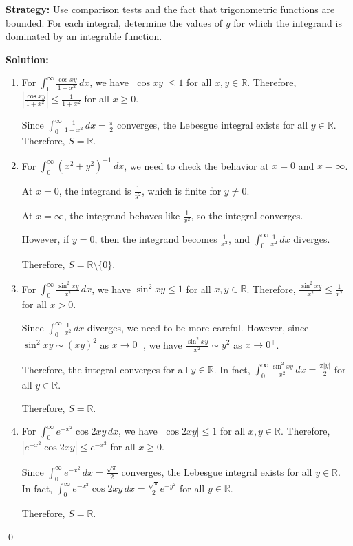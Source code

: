 \noindent\textbf{Strategy:} Use comparison tests and the fact that trigonometric functions are bounded. For each integral, determine the values of $y$ for which the integrand is dominated by an integrable function.

\bigskip\noindent\textbf{Solution:}
\begin{enumerate}[label=(\alph*)]
\item For $\int_{0}^{\infty} \frac{\cos xy}{1 + x^2} \, dx$, we have $|\cos xy| \leq 1$ for all $x, y \in \mathbb{R}$. Therefore, $|\frac{\cos xy}{1 + x^2}| \leq \frac{1}{1 + x^2}$ for all $x \geq 0$.

Since $\int_{0}^{\infty} \frac{1}{1 + x^2} \, dx = \frac{\pi}{2}$ converges, the Lebesgue integral exists for all $y \in \mathbb{R}$. Therefore, $S = \mathbb{R}$.

\item For $\int_{0}^{\infty} (x^2 + y^2)^{-1} \, dx$, we need to check the behavior at $x = 0$ and $x = \infty$.

At $x = 0$, the integrand is $\frac{1}{y^2}$, which is finite for $y \neq 0$.

At $x = \infty$, the integrand behaves like $\frac{1}{x^2}$, so the integral converges.

However, if $y = 0$, then the integrand becomes $\frac{1}{x^2}$, and $\int_{0}^{\infty} \frac{1}{x^2} \, dx$ diverges.

Therefore, $S = \mathbb{R} \setminus \{0\}$.

\item For $\int_{0}^{\infty} \frac{\sin^2 xy}{x^2} \, dx$, we have $\sin^2 xy \leq 1$ for all $x, y \in \mathbb{R}$. Therefore, $\frac{\sin^2 xy}{x^2} \leq \frac{1}{x^2}$ for all $x > 0$.

Since $\int_{0}^{\infty} \frac{1}{x^2} \, dx$ diverges, we need to be more careful. However, since $\sin^2 xy \sim (xy)^2$ as $x \to 0^+$, we have $\frac{\sin^2 xy}{x^2} \sim y^2$ as $x \to 0^+$.

Therefore, the integral converges for all $y \in \mathbb{R}$. In fact, $\int_{0}^{\infty} \frac{\sin^2 xy}{x^2} \, dx = \frac{\pi|y|}{2}$ for all $y \in \mathbb{R}$.

Therefore, $S = \mathbb{R}$.

\item For $\int_{0}^{\infty} e^{-x^2} \cos 2xy \, dx$, we have $|\cos 2xy| \leq 1$ for all $x, y \in \mathbb{R}$. Therefore, $|e^{-x^2} \cos 2xy| \leq e^{-x^2}$ for all $x \geq 0$.

Since $\int_{0}^{\infty} e^{-x^2} \, dx = \frac{\sqrt{\pi}}{2}$ converges, the Lebesgue integral exists for all $y \in \mathbb{R}$. In fact, $\int_{0}^{\infty} e^{-x^2} \cos 2xy \, dx = \frac{\sqrt{\pi}}{2} e^{-y^2}$ for all $y \in \mathbb{R}$.

Therefore, $S = \mathbb{R}$.
\end{enumerate}\qed


